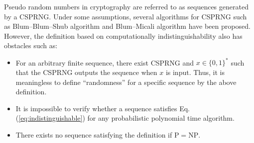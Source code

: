 Pseudo random numbers in cryptography are referred to as sequences generated by a CSPRNG. 
Under some assumptions, several algorithms for CSPRNG such as Blum--Blum--Shub algorithm \cite{blum1986simple} and Blum--Micali algorithm \cite{blum1984generate} have been proposed. 
However, the definition based on computationally indistinguishability also has obstacles such as:
\begin{itemize}
	\item For an arbitrary finite sequence, there exist CSPRNG and $x\in\{0,1\}^\ast$ such that the CSPRNG outputs the sequence when $x$ is input. Thus, it is meaningless to define ``randomness'' for a specific sequence by the above definition.
	\item It is impossible to verify whether a sequence satisfies Eq. (\ref{eq:indistinguishable}) for any probabilistic polynomial time algorithm.
	\item There exists no sequence satisfying the definition if $\mathrm{P}=\mathrm{NP}$.
\end{itemize}
